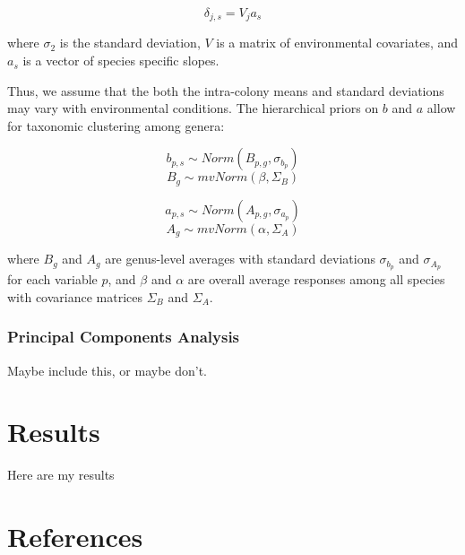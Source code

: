 \documentclass[review,preprint,3p]{elsarticle}
\begin{document}
	\begin{equation}
		\delta_{j,s} = V_j a_s
	\end{equation}
	
	where $\sigma_{2}$ is the standard deviation, $V$ is a matrix of environmental covariates, and $a_s$ is a vector of species specific slopes. 
	
	Thus, we assume that the both the intra-colony means and standard deviations may vary with environmental conditions. The hierarchical priors on $b$ and $a$ allow for taxonomic clustering among genera:
	
	\begin{equation}
		b_{p,s} \sim Norm(B_{p,g}, \sigma_{b_p})
	\end{equation}
	\begin{equation}
		B_{g} \sim mvNorm(\beta, \Sigma_B)
	\end{equation}
	
	\begin{equation}
		a_{p,s} \sim Norm(A_{p,g}, \sigma_{a_p})
	\end{equation}
	\begin{equation}
		A_{g} \sim mvNorm(\alpha, \Sigma_A)
	\end{equation}
	
	where $B_{g}$ and $A_{g}$ are genus-level averages with standard deviations $\sigma_{b_p}$ and $\sigma_{A_p}$ for each variable $p$, and $\beta$ and $\alpha$ are overall average responses among all species with covariance matrices $\Sigma_B$ and $\Sigma_A$. 
	
	\subsubsection{Principal Components Analysis}
	Maybe include this, or maybe don't.
	
	
	
	
	\section{Results}
	
	Here are my results
	
	
	
	
	
	
	\section*{References}
	
	
	
\end{document}
